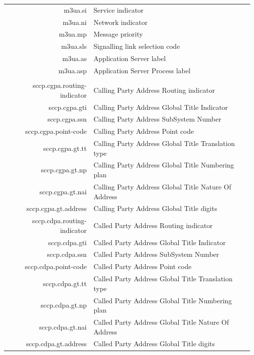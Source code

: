\documentclass[a4paper,latin]{paper}
\begin{document}
\begin{tabularx}{\linewidth}{ | >{\ttfamily} r | >{\ttfamily} X |}
	m3ua.si						& Service indicator\\
	m3ua.ni						& Network indicator\\
	m3ua.mp						& Message priority\\
	m3ua.sls					& Signalling link selection code\\
	m3ua.as						& Application Server label\\
	m3ua.asp					& Application Server Process label\\
	\hline
	\rowcolor{blue!10}
	\multicolumn{2}{| l |}{\acrfull{sccp}} 		\\
	\hline
	sccp.cgpa.routing-indicator			& Calling Party Address Routing indicator\\
	sccp.cgpa.gti					& Calling Party Address Global Title Indicator\\
	sccp.cgpa.ssn					& Calling Party Address SubSystem Number\\
	sccp.cgpa.point-code				& Calling Party Address Point code\\
	sccp.cgpa.gt.tt					& Calling Party Address Global Title Translation type\\
	sccp.cgpa.gt.np					& Calling Party Address Global Title Numbering plan\\
	sccp.cgpa.gt.nai				& Calling Party Address Global Title Nature Of Address\\
	sccp.cgpa.gt.address				& Calling Party Address Global Title digits\\
	sccp.cdpa.routing-indicator			& Called Party Address Routing indicator\\
	sccp.cdpa.gti					& Called Party Address Global Title Indicator\\
	sccp.cdpa.ssn					& Called Party Address SubSystem Number\\
	sccp.cdpa.point-code				& Called Party Address Point code\\
	sccp.cdpa.gt.tt					& Called Party Address Global Title Translation type\\
	sccp.cdpa.gt.np					& Called Party Address Global Title Numbering plan\\
	sccp.cdpa.gt.nai				& Called Party Address Global Title Nature Of Address\\
	sccp.cdpa.gt.address				& Called Party Address Global Title digits\\
	\hline
\end{tabularx}%
\clearpage
\end{document}
